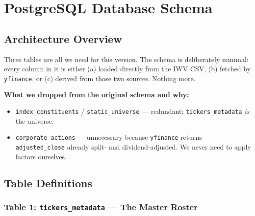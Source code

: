 \documentclass[11pt, oneside]{book}
\begin{document}
\chapter{PostgreSQL Database Schema}

\section{Architecture Overview}

Three tables are all we need for this version. The schema is deliberately minimal: every column in it is either (a) loaded directly from the IWV CSV, (b) fetched by \texttt{yfinance}, or (c) derived from those two sources. Nothing more.

\begin{center}
\end{center}

\textbf{What we dropped from the original schema and why:}
\begin{itemize}[leftmargin=*]
    \item \texttt{index\_constituents} / \texttt{static\_universe} --- redundant; \texttt{tickers\_metadata} \textit{is} the universe.
    \item \texttt{corporate\_actions} --- unnecessary because \texttt{yfinance} returns \texttt{adjusted\_close} already split- and dividend-adjusted. We never need to apply factors ourselves.
\end{itemize}

\section{Table Definitions}

\subsection{Table 1: \texttt{tickers\_metadata} --- The Master Roster}
\end{document}
